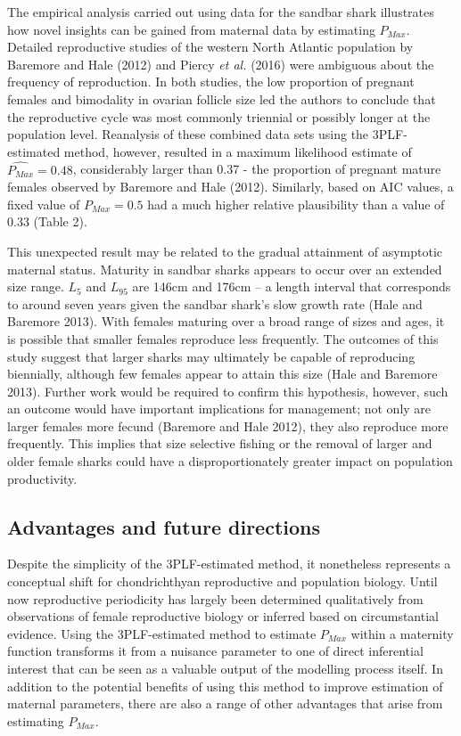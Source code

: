 \documentclass[
]{article}
\begin{document}
The empirical analysis carried out using data for the sandbar shark illustrates how novel insights can be gained from maternal data by estimating \(P_{Max}\). Detailed reproductive studies of the western North Atlantic population by Baremore and Hale (2012) and Piercy \emph{et al.} (2016) were ambiguous about the frequency of reproduction. In both studies, the low proportion of pregnant females and bimodality in ovarian follicle size led the authors to conclude that the reproductive cycle was most commonly triennial or possibly longer at the population level. Reanalysis of these combined data sets using the 3PLF-estimated method, however, resulted in a maximum likelihood estimate of \(\hat{P_{Max}} = 0.48\), considerably larger than 0.37 - the proportion of pregnant mature females observed by Baremore and Hale (2012). Similarly, based on AIC values, a fixed value of \(P_{Max} = 0.5\) had a much higher relative plausibility than a value of 0.33 (Table 2).

This unexpected result may be related to the gradual attainment of asymptotic maternal status. Maturity in sandbar sharks appears to occur over an extended size range. \(L_{5}\) and \(L_{95}\) are 146cm and 176cm -- a length interval that corresponds to around seven years given the sandbar shark's slow growth rate (Hale and Baremore 2013). With females maturing over a broad range of sizes and ages, it is possible that smaller females reproduce less frequently. The outcomes of this study suggest that larger sharks may ultimately be capable of reproducing biennially, although few females appear to attain this size (Hale and Baremore 2013). Further work would be required to confirm this hypothesis, however, such an outcome would have important implications for management; not only are larger females more fecund (Baremore and Hale 2012), they also reproduce more frequently. This implies that size selective fishing or the removal of larger and older female sharks could have a disproportionately greater impact on population productivity.

\subsection{Advantages and future directions}\label{advantages-and-future-directions}

Despite the simplicity of the 3PLF-estimated method, it nonetheless represents a conceptual shift for chondrichthyan reproductive and population biology. Until now reproductive periodicity has largely been determined qualitatively from observations of female reproductive biology or inferred based on circumstantial evidence. Using the 3PLF-estimated method to estimate \(P_{Max}\) within a maternity function transforms it from a nuisance parameter to one of direct inferential interest that can be seen as a valuable output of the modelling process itself. In addition to the potential benefits of using this method to improve estimation of maternal parameters, there are also a range of other advantages that arise from estimating \(P_{Max}\).
\end{document}
